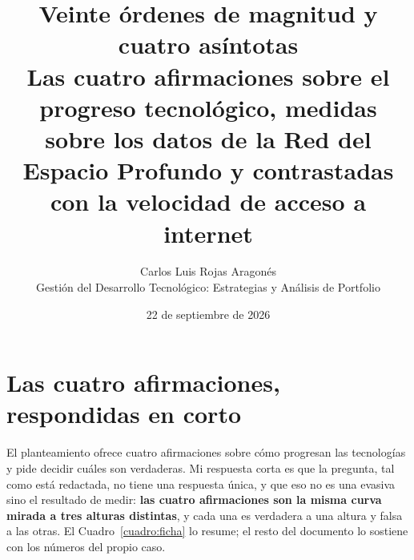 \documentclass[11pt,letterpaper]{article}
\title{\vspace{-1.2cm}\textbf{Veinte órdenes de magnitud y cuatro asíntotas}\\
\large Las cuatro afirmaciones sobre el progreso tecnológico, medidas sobre
los datos de la Red del Espacio Profundo y contrastadas con la velocidad de
acceso a internet}
\author{Carlos Luis Rojas Aragonés\\
\small Gestión del Desarrollo Tecnológico: Estrategias y Análisis de Portfolio}
\date{\small 22 de septiembre de 2026}
\begin{document}
\maketitle
\vspace{-0.8em}

\section{Las cuatro afirmaciones, respondidas en corto}

El planteamiento ofrece cuatro afirmaciones sobre cómo progresan las
tecnologías y pide decidir cuáles son verdaderas. Mi respuesta corta es que la
pregunta, tal como está redactada, no tiene una respuesta única, y que eso no
es una evasiva sino el resultado de medir: \textbf{las cuatro afirmaciones son
la misma curva mirada a tres alturas distintas}, y cada una es verdadera a una
altura y falsa a las otras. El Cuadro~\ref{cuadro:ficha} lo resume; el resto
del documento lo sostiene con los números del propio caso.
\end{document}
